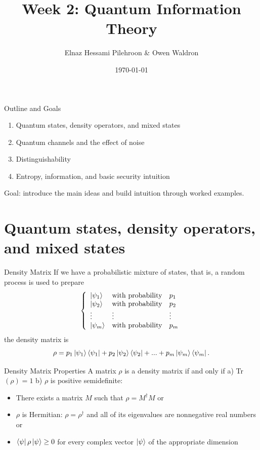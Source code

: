 \documentclass[10pt,aspectratio=169]{beamer}
\title{Week 2: Quantum Information Theory}
\subtitle{}
\author{Elnaz Hessami Pilehroon \& Owen Waldron}
\date{\today}
\begin{document}
{
\begin{frame}[plain]
  \titlepage
\end{frame}
}

\begin{frame}{Outline and Goals}
  \begin{enumerate}
    \item Quantum states, density operators, and mixed states
    \item Quantum channels and the effect of noise
    \item Distinguishability
    \item Entropy, information, and basic security intuition
  \end{enumerate}
  \vspace{1em}
  \centering\small Goal: introduce the main ideas and build intuition through worked examples.
\end{frame}

\section{Quantum states, density operators, and mixed states}

\begin{frame}{Density Matrix}
    If we have a probabilistic mixture of states, that is, a random process is used to prepare 
    \[
    \left\{
    \begin{array}{lll}
    \ket{\psi_1} & \text{with probability} & p_1 \\
    \ket{\psi_2} & \text{with probability} & p_2 \\
    \vdots       & \vdots                  & \vdots \\
    \ket{\psi_m} & \text{with probability} & p_m
    \end{array}
    \right.
    \]
    the density matrix is 
    \[\rho = p_1 \ket{\psi_1}\bra{\psi_1} + p_2 \ket{\psi_2}\bra{\psi_2} + ... + p_m\ket{\psi_m}\bra{\psi_m}. \]
\end{frame}


\begin{frame}{Density Matrix Properties}
    A matrix $\rho$ is a density matrix if and only if 
    \newline 
    a) Tr$(\rho) = 1$
    \newline 
    b) $\rho$ is positive semidefinite:
    \begin{itemize}
        \item There exists a matrix $M$ such that $\rho = M^\dagger M$ or 
        \item $\rho$ is Hermitian: $\rho = \rho^\dagger$ and all of its eigenvalues are nonnegative real numbers or
        \item $\bra{\psi}\rho\ket{\psi} \geq 0$ for every complex vector $\ket{\psi}$ of the appropriate dimension
    \end{itemize}
\end{frame}
\end{document}
